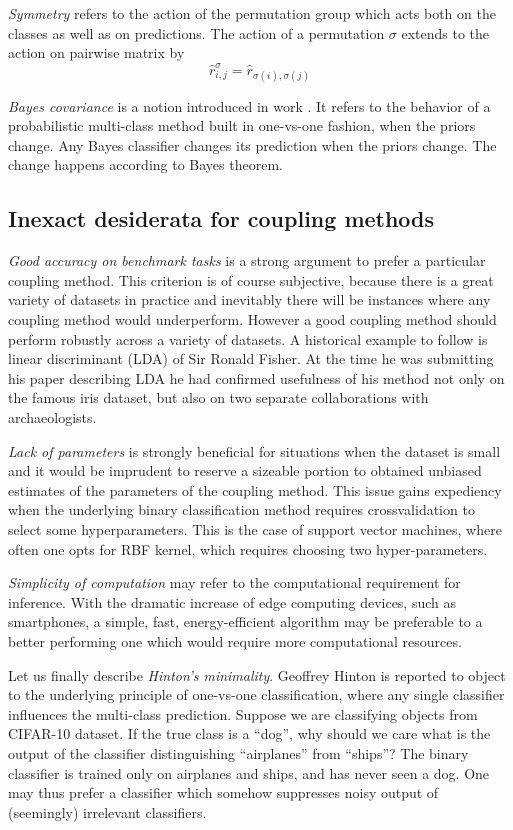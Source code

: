 \documentclass[twoside,11pt]{article}
\begin{document}
\emph{Symmetry} refers to the action of the permutation group which acts both on the classes as well as on predictions. The action of a permutation $\sigma$ extends to the action on pairwise matrix by 
\begin{equation}
	\hat r^\sigma_{i,j} = \hat r_{\sigma(i), \sigma(j)}
\end{equation}

\emph{Bayes covariance} is a notion introduced in work \cite{BarredaSuch}. It refers to the behavior of a probabilistic multi-class method built in one-vs-one fashion, when the priors change. Any Bayes classifier changes its prediction when the priors change. The change happens according to Bayes theorem.


\subsection{Inexact desiderata for coupling methods}

\emph{Good accuracy on benchmark tasks} is  a strong argument to prefer a particular coupling method. This criterion is of course subjective, because there is a great variety of datasets in practice and inevitably there will be instances where any coupling method would underperform. However a good coupling method should perform robustly across a variety of datasets. A historical  example to follow is linear discriminant (LDA) of  Sir Ronald Fisher. At the time he was submitting his paper describing LDA he had confirmed usefulness of his method not only on the famous iris dataset, but also on two separate collaborations with archaeologists. 

\emph{Lack of parameters} is strongly beneficial for situations when the dataset is small and it would be imprudent to reserve a sizeable portion to obtained unbiased estimates of the parameters of the coupling method. This issue gains expediency when the underlying binary classification method requires crossvalidation to select some hyperparameters. This is the case of support vector machines, where often one opts for RBF kernel, which requires choosing two hyper-parameters. 

\emph{Simplicity of computation}  may refer to the computational requirement for inference. With the dramatic increase of edge computing devices, such as smartphones, a simple, fast, energy-efficient algorithm may be preferable to a better performing one which would require more computational resources. 

Let us finally describe \emph{Hinton's minimality}. Geoffrey Hinton is reported to object to the underlying principle of one-vs-one classification, where any single classifier influences the multi-class prediction. Suppose we are classifying objects from CIFAR-10 dataset.  If the true class is  a ``dog'', why should we care what is the output of the classifier distinguishing ``airplanes'' from ``ships''? The binary classifier is trained only on airplanes and ships, and has never seen a dog. One may thus prefer a classifier which somehow suppresses noisy output of (seemingly) irrelevant classifiers.
\end{document}
